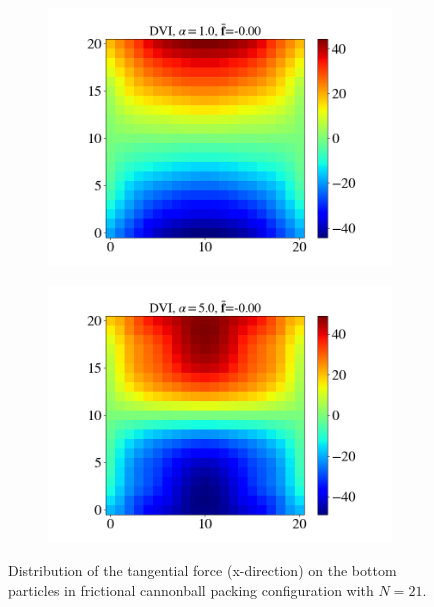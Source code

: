 \begin{itemize}
\begin{figure}[H]
\begin{subfigure}{0.32\columnwidth}
			\includegraphics[width=1.0\textwidth]{images/CD/Example7/20/T1_21_DVI_1.0.png}
		\end{subfigure}
		\begin{subfigure}{0.32\columnwidth}	
			\centering
			\includegraphics[width=1.0\textwidth]{images/CD/Example7/20/T1_21_DVI_5.0.png}
		\end{subfigure}
		\caption{Distribution of the tangential force (x-direction) on the bottom particles in frictional cannonball packing configuration with $N=21$.}\label{fig:cbp_fp_T1=21}
	\end{figure}
	

\end{itemize}
